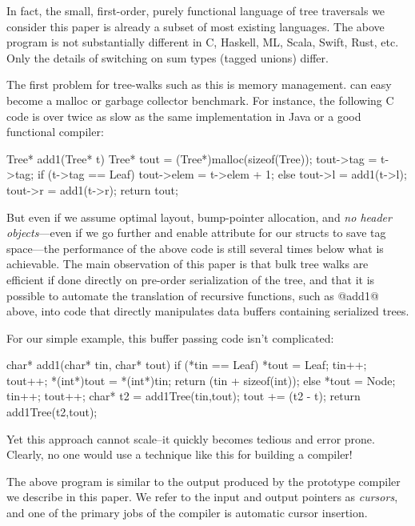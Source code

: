 \documentclass[preprint,10pt,nocopyrightspace,nonatbib]{./bibs/sigplanconf}
\begin{document}
In fact, the small, first-order, purely functional language of tree traversals
we consider this paper is already a subset of most existing languages.
The above program is not substantially different in C, Haskell, ML, Scala,
Swift, Rust, etc.  Only the details of switching on sum types (tagged unions) differ.

The first problem for tree-walks such as this is memory management.  
can easy become a malloc or garbage collector benchmark.  For instance, the
following C code is over twice as slow as the same implementation in Java or a
good functional compiler:

\begin{code}[language=c]
  Tree* add1(Tree* t) {
    Tree* tout = (Tree*)malloc(sizeof(Tree));
    tout->tag = t->tag;
    if (t->tag == Leaf) {
      tout->elem = t->elem + 1;
    } else {
      tout->l = add1(t->l);
      tout->r = add1(t->r);
    }
    return tout;
  }
\end{code}

But even if we assume optimal layout, bump-pointer allocation, and {\em no
  header objects}---even if we go further and enable  attribute
for our structs to save tag space---the performance of the above code is still
several times below what is achievable.  The main observation of this paper is
that bulk tree walks are efficient if done directly on pre-order serialization
of the tree, and that it is possible to automate the translation of recursive
functions, such as @add1@ above, into code that directly manipulates data
buffers containing serialized trees.

For our simple example, this buffer passing code isn't complicated:
%
\begin{code}[language=c]
char* add1(char* tin, char* tout) {
  if (*tin == Leaf) {
    *tout = Leaf;
    tin++; tout++;
    *(int*)tout = *(int*)tin;
    return (tin + sizeof(int));
  } else {
    *tout = Node;
    tin++; tout++;
    char* t2 = add1Tree(tin,tout);
    tout += (t2 - t);
    return add1Tree(t2,tout);
  }
}
\end{code}
%
Yet this approach cannot scale--it quickly becomes tedious and error prone.
Clearly, no one would use a technique like this for building a compiler!

The above program is similar to the output produced by the prototype compiler we
describe in this paper.  We refer to the input and output pointers as {\em
  cursors}, and one of the primary jobs of the compiler is automatic cursor
insertion.
\end{document}
